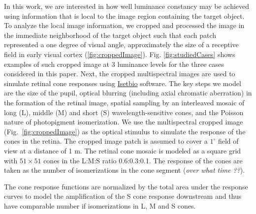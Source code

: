 \documentclass{jov}
\begin{document}
In this work, we are interested in how well luminance constancy may be achieved using information that is local to the image region containing the target object. 
To analyze the local image information, we cropped and processed the image in the immediate neighborhood of the target object such that each patch represented a one degree of visual angle, approximately the size of a receptive field in early visual cortex (\ref{fig:croppedImage}).
Fig. \ref{fig:studiedCases} shows examples of such cropped image at 3 luminance levels for the three cases considered in this paper.
Next, the cropped multispectral images are used to simulate retinal cone responses using \href{https://github.com/isetbio}{Isetbio} software. The key steps we model are the size of the pupil, optical blurring (including axial chromatic aberration) in the formation of the retinal image, spatial sampling by an interleaved mosaic of long (L), middle (M)  and short (S) wavelength-sensitive cones, and the Poisson nature of photopigment isomerization.
We use the multispectral cropped image (Fig.~\ref{fig:croppedImage}) as the optical stimulus to simulate the response of the cones in the retina. The cropped image patch is assumed to cover a $1^{\circ}$ field of view at a distance of 1 m. The retinal cone mosaic is modeled as a square grid with $51 \times 51$ cones in the L:M:S ratio 0.6:0.3:0.1. The response of the cones are taken as the number of isomerizations in the cone segment ({\it over what time ??}).

The cone response functions are normalized by the total area under the response curves to model the amplification of the S cone response downstream and thus have comparable number if isomerizations in L, M and S cones. 
\end{document}
